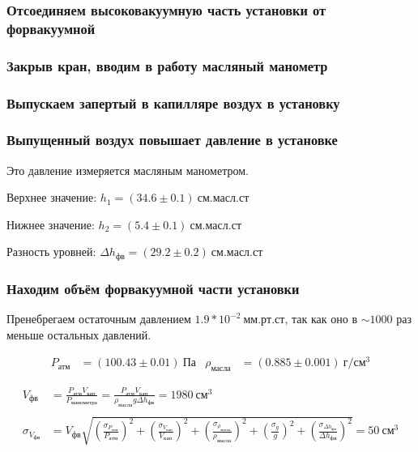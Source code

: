 \documentclass[a4paper, 12pt]{article}
\begin{document}
        \subsubsection{Отсоединяем высоковакуумную часть установки от форвакуумной}

        \subsubsection{Закрыв кран, вводим в работу масляный манометр}

        \subsubsection{Выпускаем запертый в капилляре воздух в установку}

        \subsubsection{Выпущенный воздух повышает давление в установке}

            Это давление измеряется масляным манометром.

            Верхнее значение: $h_1 = (34.6 \pm 0.1)~см.масл.ст$

            Нижнее значение:  $h_2 = (5.4 \pm 0.1)~см.масл.ст$

            Разность уровней: $\Delta h_{фв} = (29.2 \pm 0.2)~см.масл.ст$

        \subsubsection{Находим объём форвакуумной части установки}

            Пренебрегаем остаточным давлением $1.9*10^{-2}~мм.рт.ст$, так как оно в $\sim1000$ раз меньше остальных давлений.

            \begin{align*}
                P_{атм} &= (100.43 \pm 0.01)~Па & \rho_{масла} &= (0.885 \pm 0.001)~г/см^3
            \end{align*}

            \begin{align*}
                V_{фв} &= \frac{P_{атм} V_{кап}}{P_{манометра}} = \frac{P_{атм} V_{кап}}{\rho_{масла} g \Delta h_{фв}} = 1980~см^3\\\\
                \sigma_{V_{фв}} &= V_{фв} \sqrt{\left( \frac{\sigma_{P_{атм}}}{P_{атм}} \right)^2 + \left( \frac{\sigma_{V_{кап}}}{V_{кап}} \right)^2 + \left( \frac{\sigma_{\rho_{масла}}}{\rho_{масла}} \right)^2 + \left( \frac{\sigma_{g}}{g} \right)^2 + \left( \frac{\sigma_{\Delta h_{фв}}}{\Delta h_{фв}} \right)^2} = 50~см^3
            \end{align*}
\end{document}
